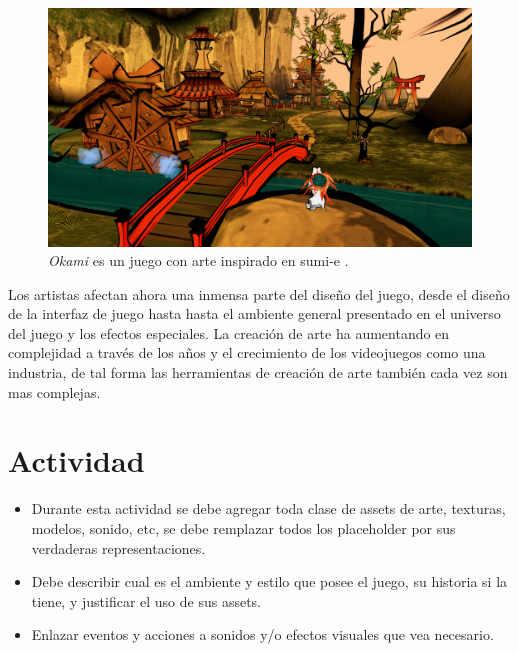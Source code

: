 \begin{figure}
\includegraphics[width=\linewidth]{media/okamips2.jpg}
\caption{\emph{Okami} \cite{okami} es un juego con arte inspirado en sumi-e \cite{sumie}.}
\label{fig:particles}
\end{figure}
Los artistas afectan ahora una inmensa parte del diseño del juego, desde el diseño de la interfaz de juego hasta hasta el ambiente general presentado en el universo del juego y los efectos especiales. La creación de arte ha aumentando en complejidad a través de los años y el crecimiento de los videojuegos como una industria, de tal forma las herramientas de creación de arte también cada vez son mas complejas.
\section{Actividad}
\begin{itemize}
\item Durante esta actividad se debe agregar toda clase de assets de arte, texturas, modelos, sonido, etc, se debe remplazar todos los placeholder por sus verdaderas representaciones.
\item Debe describir cual es el ambiente y estilo que posee el juego, su historia si la tiene, y justificar el uso de sus assets.
\item Enlazar eventos y acciones a sonidos y/o efectos visuales que vea necesario.
\end{itemize}
